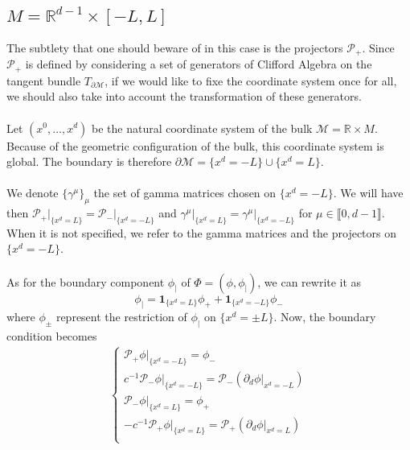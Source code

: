 \subsection{${M} = \mathbb{R}^{d-1} \times [-L, L]$ }\label{wen-subsect-saw2}
The subtlety that one should beware of in this case is the projectors $\mathcal{P}_+$.
Since $\mathcal{P}_+$ is defined by considering a set of generators of Clifford Algebra on the tangent bundle $T_{ \partial \mathcal{M}}$, 
if we would like to fixe the coordinate system once for all,
we should also take into account the transformation of these generators. \\\\
Let $(x^0, \ldots, x^d)$ be the natural coordinate system of the bulk $\mathcal{M} =\mathbb{R}\times M $. 
Because of the geometric configuration of the bulk, 
this coordinate system is global. 
The boundary is therefore $\partial \mathcal{M} = \{x^d = -L \} \cup \{ x^d = L \}$.
\\\\
We denote $\{\gamma^\mu\}_\mu$ the set of gamma matrices chosen on $\{x^d  = - L \}$. 
We will have then $\mathcal{P}_+\vert_{\{x^d = L\}} = \mathcal{P}_-\vert_{\{x^d = -L\}}$ and $\gamma^\mu\vert_{\{x^d = L\}}=\gamma^\mu\vert_{\{x^d = -L\}}$ for $\mu\in\llbracket 0, d-1 \rrbracket$.
When it is not specified, we refer to the gamma matrices and the projectors on $\{x^d = -L\}$. \\\\
%
As for the boundary component $\phi_|$ of $\Phi= (\phi, \phi_|)$,
we can rewrite it as
\begin{equation*}
\phi_| = \mathbf{1}_{\{x^d = L \}}\phi_+ + \mathbf{1}_{\{x^d = - L \}}\phi_-
\end{equation*}
where $\phi_\pm$ represent the restriction of $\phi_|$ on $\{x^d = \pm L \}$.
Now, the boundary condition becomes
\begin{equation}\label{wen-saw2bound}
\begin{split}
\begin{cases}
\mathcal{P}_+ \phi\vert_{\{x^d = -L\}} = \phi_- \\
c^{-1}\mathcal{P}_-\phi\vert_{\{x^d = -L\}} = \mathcal{P}_-(\partial_d \phi\vert_{x^d = -L}) \\
\mathcal{P}_- \phi\vert_{\{x^d = L\}} =\phi_+ \\
-c^{-1}\mathcal{P}_+\phi\vert_{\{x^d = L\}} = \mathcal{P}_+(\partial_d \phi\vert_{x^d = L}) \\
\end{cases}
\end{split}
\end{equation}
